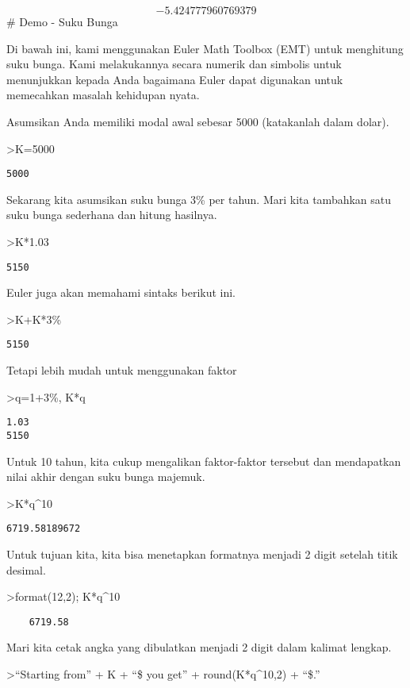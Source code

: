 \documentclass[
]{book}
\begin{document}
\[-5.424777960769379\]\# Demo - Suku Bunga

Di bawah ini, kami menggunakan Euler Math Toolbox (EMT) untuk menghitung suku bunga. Kami melakukannya secara numerik dan simbolis untuk menunjukkan kepada Anda bagaimana Euler dapat digunakan untuk memecahkan masalah kehidupan nyata.

Asumsikan Anda memiliki modal awal sebesar 5000 (katakanlah dalam dolar).

\textgreater K=5000

\begin{verbatim}
5000
\end{verbatim}

Sekarang kita asumsikan suku bunga 3\% per tahun. Mari kita tambahkan satu suku bunga sederhana dan hitung hasilnya.

\textgreater K*1.03

\begin{verbatim}
5150
\end{verbatim}

Euler juga akan memahami sintaks berikut ini.

\textgreater K+K*3\%

\begin{verbatim}
5150
\end{verbatim}

Tetapi lebih mudah untuk menggunakan faktor

\textgreater q=1+3\%, K*q

\begin{verbatim}
1.03
5150
\end{verbatim}

Untuk 10 tahun, kita cukup mengalikan faktor-faktor tersebut dan mendapatkan nilai akhir dengan suku bunga majemuk.

\textgreater K*q\^{}10

\begin{verbatim}
6719.58189672
\end{verbatim}

Untuk tujuan kita, kita bisa menetapkan formatnya menjadi 2 digit setelah titik desimal.

\textgreater format(12,2); K*q\^{}10

\begin{verbatim}
    6719.58 
\end{verbatim}

Mari kita cetak angka yang dibulatkan menjadi 2 digit dalam kalimat lengkap.

\textgreater{}``Starting from'' + K + ``\$ you get'' + round(K*q\^{}10,2) + ``\$.''
\end{document}
